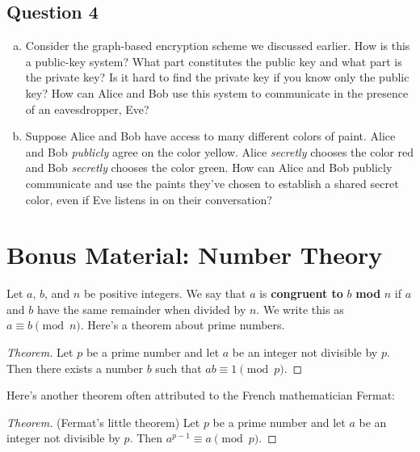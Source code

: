 \documentclass[12pt]{article}
\newenvironment{theorem}
{\begin{proof}[Theorem]}
{\end{proof}}
\begin{document}
\subsection*{Question 4}
\begin{enumerate}[(a)]
	\item Consider the graph-based encryption scheme we discussed earlier. How is this a public-key system? What part constitutes the public key and what part is the private key? Is it hard to find the private key if you know only the public key? How can Alice and Bob use this system to communicate in the presence of an eavesdropper, Eve?

	\vspace {3cm}

	\item Suppose Alice and Bob have access to many different colors of paint. Alice and Bob \textit{publicly} agree on the color yellow. Alice \textit{secretly} chooses the color red and Bob \textit{secretly} chooses the color green. How can Alice and Bob publicly communicate and use the paints they've chosen to establish a shared secret color, even if Eve listens in on their conversation?
\end{enumerate}

\newpage

\section*{Bonus Material: Number Theory}
Let $a$, $b$, and $n$ be positive integers. We say that $a$ is \textbf{congruent to} $b$ \textbf{mod} $n$ if $a$ and $b$ have the same remainder when divided by $n$. We write this as $a\equiv b\pmod{n}$. Here's a theorem about prime numbers.
\begin{theorem}
	Let $p$ be a prime number and let $a$ be an integer not divisible by $p$. Then there exists a number $b$ such that $ab\equiv 1\pmod{p}$.
\end{theorem}

\noindent Here's another theorem often attributed to the French mathematician Fermat:
\begin{theorem}(Fermat's little theorem)
	Let $p$ be a prime number and let $a$ be an integer not divisible by $p$. Then $a^{p-1}\equiv a \pmod{p}$.
\end{theorem}
\end{document}
